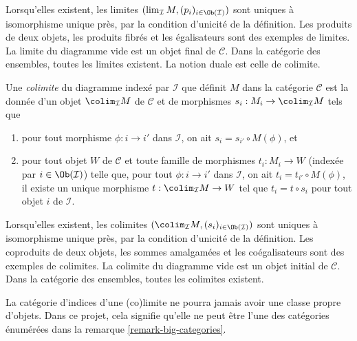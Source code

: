 \noindent
Lorsqu'elles existent, les limites
$(\lim_\mathcal{I} M, (p_i)_{i\in \Ob(\mathcal{I})})$
sont uniques à isomorphisme unique près, par la condition d'unicité
de la définition. Les produits de deux objets, les produits fibrés et les
égalisateurs sont des exemples de limites. La limite du diagramme vide
est un objet final de $\mathcal{C}$.
Dans la catégorie des ensembles, toutes les limites existent.
La notion duale est celle de colimite.

\begin{definition}
\label{definition-colimit}
Une {\it colimite} du diagramme indexé par $\mathcal{I}$ que définit $M$ dans la
catégorie
$\mathcal{C}$ est la donnée d'un objet $\colim_\mathcal{I} M$ de $\mathcal{C}$
et de morphismes $s_i : M_i \to \colim_\mathcal{I} M$ tels que
\begin{enumerate}
\item pour tout morphisme $\phi : i \to i'$
dans $\mathcal{I}$, on ait $s_i = s_{i'} \circ M(\phi)$, et
\item pour tout objet $W$ de $\mathcal{C}$ et toute famille de
morphismes $t_i : M_i \to W$ (indexée par $i \in \Ob(\mathcal{I})$)
telle que, pour tout $\phi : i \to i'$
dans $\mathcal{I}$, on ait $t_i = t_{i'} \circ M(\phi)$, il existe
un unique morphisme $t : \colim_\mathcal{I} M \to W$ tel que
$t_i = t \circ s_i$ pour tout objet $i$ de $\mathcal{I}$.
\end{enumerate}
\end{definition}

\noindent
Lorsqu'elles existent, les colimites
$(\colim_\mathcal{I} M, (s_i)_{i\in \Ob(\mathcal{I})})$
sont uniques à isomorphisme unique près, par la condition d'unicité
de la définition. Les coproduits de deux objets, les sommes amalgamées et
les coégalisateurs sont des exemples de colimites. La colimite du diagramme
vide est un objet initial de $\mathcal{C}$. Dans la catégorie des ensembles,
toutes les colimites existent.

\begin{remark}
\label{remark-diagram-small}
La catégorie d'indices d'une (co)limite ne pourra jamais avoir une classe
propre d'objets. Dans ce projet, cela signifie qu'elle ne peut être l'une
des catégories énumérées dans la remarque \ref{remark-big-categories}.
\end{remark}

